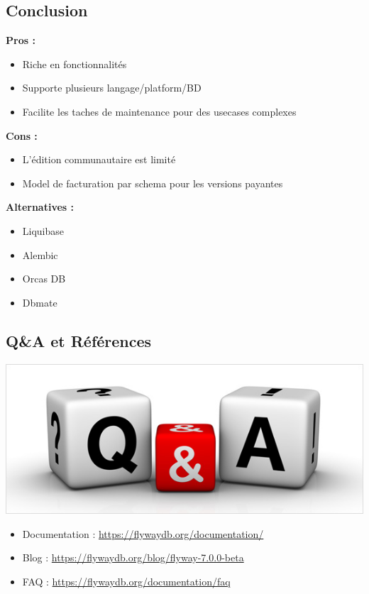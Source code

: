 \documentclass[slidestop,compress,11pt,xcolor=dvipsnames,french]{beamer}
\begin{document}
\subsection*{Conclusion }
\begin{frame}
\textbf {Pros : \\}
\begin{itemize}
 \item Riche en fonctionnalités 
 \item Supporte plusieurs langage/platform/BD
 \item Facilite les taches de maintenance pour des usecases complexes
\end{itemize}
\textbf {Cons : \\}
\begin{itemize}
 \item L'édition communautaire est limité 
 \item Model de facturation par schema pour les versions payantes
\end{itemize}
\textbf {Alternatives : \\}
\begin{itemize}
 \item Liquibase 
 \item Alembic
 \item Orcas DB
 \item Dbmate
\end{itemize}
\end{frame}

\subsection*{Q\&A et Références}
\begin{frame}
\begin{center}
 \includegraphics[scale=0.3,keepaspectratio=true]{qa.jpg}
\end{center}

\vspace{1cm}
\begin{itemize}
 \item Documentation : \url{https://flywaydb.org/documentation/} 
 \item Blog : \url{https://flywaydb.org/blog/flyway-7.0.0-beta}
 \item FAQ : \url{https://flywaydb.org/documentation/faq}
\end{itemize}

\end{frame}
\end{document}
